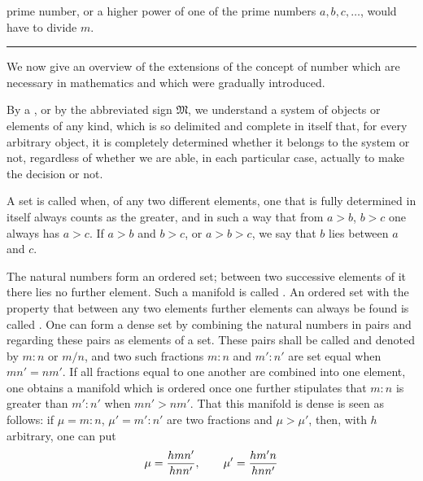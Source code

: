 prime number, or a higher power of one of the prime numbers
$a,b,c,\ldots$, would have to divide $m$.

\begin{center}
\rule{0.18\linewidth}{0.4pt}
\end{center}

We now give an overview of the extensions of the concept of number
which are necessary in mathematics and which were gradually introduced.

By a , or by the abbreviated sign
$\mathfrak M$, we understand a system of objects or elements of any
kind, which is so delimited and complete in itself that, for every
arbitrary object, it is completely determined whether it belongs to
the system or not, regardless of whether we are able, in each
particular case, actually to make the decision or not.

A set is called  when, of any two different elements,
one that is fully determined in itself always counts as the greater,
and in such a way that from $a>b$, $b>c$ one always has $a>c$. If
$a>b$ and $b>c$, or $a>b>c$, we say that $b$ lies between $a$ and
$c$.%

The natural numbers form an ordered set; between two successive
elements of it there lies no further element. Such a manifold is called
. An ordered set with the property that between any
two elements further elements can always be found is called
. One can form a dense set by combining the natural
numbers in pairs and regarding these pairs as elements of a set. These
pairs shall be called  and denoted by $m:n$ or
$m/n$, and two such fractions $m:n$ and $m':n'$ are set equal when
$mn'=nm'$. If all fractions equal to one another are combined into one
element, one obtains a manifold which is ordered once one further
stipulates that $m:n$ is greater than $m':n'$ when $mn'>nm'$. That this
manifold is dense is seen as follows: if $\mu=m:n$, $\mu'=m':n'$ are
two fractions and $\mu>\mu'$, then, with $h$ arbitrary, one can put
\[
 \mu={hmn'\over hnn'},
 \qquad
 \mu'={hm'n\over hnn'}
\]
